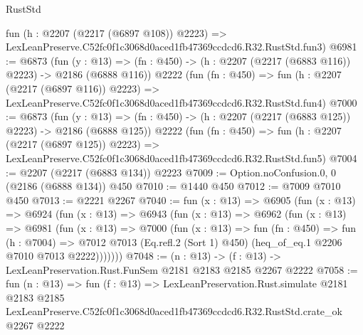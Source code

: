 \begin{lexlean}{RustStd}
\begin{coremodule}
    fun (h : @2207 (@2217 (@6897 @108)) @2223) =>
    LexLeanPreserve.C52fc0f1c3068d0aced1fb47369ccdcd6.R32.RustStd.fun3)
@6981 := @6873
    (fun (y : @13) => (fn : @450) -> (h : @2207 (@2217 (@6883 @116)) @2223) -> @2186 (@6888 @116))
    @2222
    (fun (fn : @450) =>
    fun (h : @2207 (@2217 (@6897 @116)) @2223) =>
    LexLeanPreserve.C52fc0f1c3068d0aced1fb47369ccdcd6.R32.RustStd.fun4)
@7000 := @6873
    (fun (y : @13) => (fn : @450) -> (h : @2207 (@2217 (@6883 @125)) @2223) -> @2186 (@6888 @125))
    @2222
    (fun (fn : @450) =>
    fun (h : @2207 (@2217 (@6897 @125)) @2223) =>
    LexLeanPreserve.C52fc0f1c3068d0aced1fb47369ccdcd6.R32.RustStd.fun5)
@7004 := @2207 (@2217 (@6883 @134)) @2223
@7009 := Option.noConfusion.{0, 0} (@2186 (@6888 @134)) @450
@7010 := @1440 @450
@7012 := @7009 @7010 @450
@7013 := @2221 @2267
@7040 := fun (x : @13) =>
  @6905
    (fun (x : @13) =>
    @6924
      (fun (x : @13) =>
      @6943
        (fun (x : @13) =>
        @6962
          (fun (x : @13) =>
          @6981
            (fun (x : @13) =>
            @7000
              (fun (x : @13) =>
              fun (fn : @450) =>
              fun (h : @7004) =>
              @7012 @7013 (Eq.refl.{2} (Sort 1) @450) (heq_of_eq.{1} @2206 @7010 @7013 @2222)))))))
@7048 := (n : @13) -> (f : @13) -> LexLeanPreservation.Rust.FunSem @2181 @2183 @2185 @2267 @2222
@7058 := fun (n : @13) =>
  fun (f : @13) =>
  LexLeanPreservation.Rust.simulate
    @2181
    @2183
    @2185
    LexLeanPreserve.C52fc0f1c3068d0aced1fb47369ccdcd6.R32.RustStd.crate_ok
    @2267
    @2222
\end{coremodule}
\end{lexlean}

